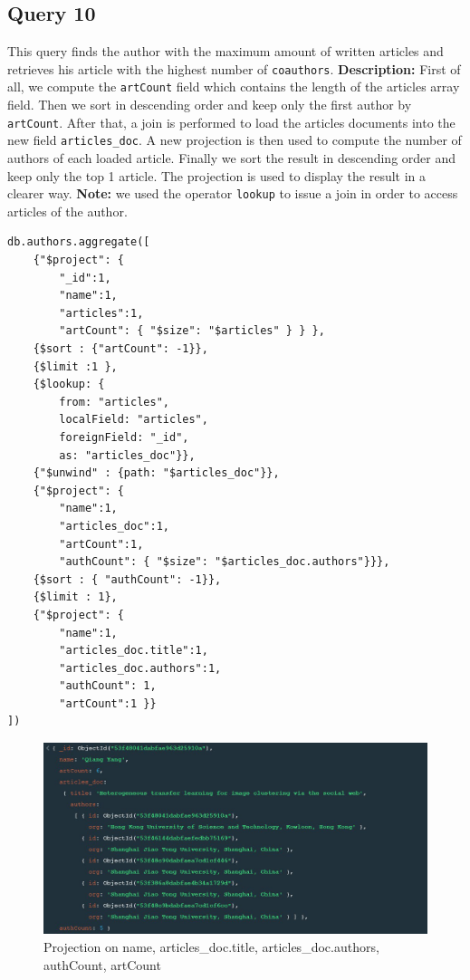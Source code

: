 \documentclass{Configuration_Files/PoliMi3i_thesis}
\begin{document}
\subsection{Query 10}
This query finds the author with the maximum amount of written articles and retrieves his article with the highest number
of \verb |coauthors|.\newline
\textbf{Description:} First of all, we compute the \verb |artCount| field which contains the length of the articles array field.
Then we sort in descending order and keep only the first author by \verb |artCount|. After that, a join is performed to load the
articles documents into the new field \verb |articles_doc|. A new projection is then used to compute the number of authors of
each loaded article. Finally we sort the result in descending order and keep only the top 1 article. The projection is used
to display the result in a clearer way.\newline
\textbf{Note:} we used the operator \verb |lookup| to issue a join in order to access articles of the author.
\begin{lstlisting}
db.authors.aggregate([
	{"$project": {
		"_id":1,
		"name":1,
		"articles":1,
		"artCount": { "$size": "$articles" } } },
	{$sort : {"artCount": -1}},
	{$limit :1 },
	{$lookup: {
		from: "articles",
		localField: "articles",
		foreignField: "_id",
		as: "articles_doc"}},
	{"$unwind" : {path: "$articles_doc"}},
	{"$project": {
		"name":1,
		"articles_doc":1,
		"artCount":1,
		"authCount": { "$size": "$articles_doc.authors"}}},
	{$sort : { "authCount": -1}},
	{$limit : 1},
	{"$project": {
		"name":1,
		"articles_doc.title":1,
		"articles_doc.authors":1,
		"authCount": 1,
		"artCount":1 }}
])
\end{lstlisting}
\begin{figure}[H]
\centering
\includegraphics[width=1\textwidth]{query/mongo_q10.PNG}
\caption{Projection on name, articles\_doc.title, articles\_doc.authors, authCount, artCount}
\label{fig:query10}
\end{figure}
\end{document}
